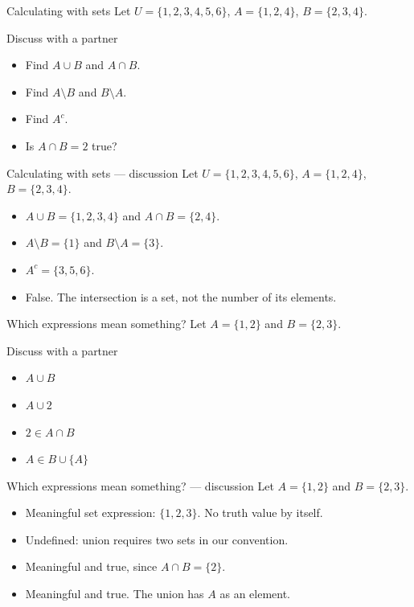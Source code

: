 \documentclass{beamer}
\begin{document}
\begin{frame}{Calculating with sets}
Let $U=\{1,2,3,4,5,6\}$, $A=\{1,2,4\}$, $B=\{2,3,4\}$.
\begin{block}{Discuss with a partner}
\begin{itemize}
\item Find $A\cup B$ and $A\cap B$.
\item Find $A\setminus B$ and $B\setminus A$.
\item Find $A^c$.
\item Is $A\cap B=2$ true?
\end{itemize}
\end{block}
\end{frame}
\begin{frame}{Calculating with sets --- discussion}
Let $U=\{1,2,3,4,5,6\}$, $A=\{1,2,4\}$, $B=\{2,3,4\}$.
\begin{itemize}
\item $A\cup B=\{1,2,3,4\}$ and $A\cap B=\{2,4\}$.
\item $A\setminus B=\{1\}$ and $B\setminus A=\{3\}$.
\item $A^c=\{3,5,6\}$.
\item False. The intersection is a set, not the number of its elements.
\end{itemize}
\end{frame}
\begin{frame}{Which expressions mean something?}
Let $A=\{1,2\}$ and $B=\{2,3\}$.
\begin{block}{Discuss with a partner}
\begin{itemize}
\item $A\cup B$
\item $A\cup 2$
\item $2\in A\cap B$
\item $A\in B\cup\{A\}$
\end{itemize}
\end{block}
\end{frame}
\begin{frame}{Which expressions mean something? --- discussion}
Let $A=\{1,2\}$ and $B=\{2,3\}$.
\begin{itemize}
\item Meaningful set expression: $\{1,2,3\}$. No truth value by itself.
\item Undefined: union requires two sets in our convention.
\item Meaningful and true, since $A\cap B=\{2\}$.
\item Meaningful and true. The union has $A$ as an element.
\end{itemize}
\end{frame}
\end{document}
